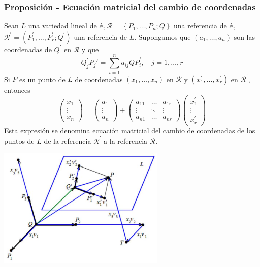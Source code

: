 \documentclass[12pt, a4paper, ones, notitlepage, openany,titlepage]{article}
\begin{document}
\subsubsection{Proposición - Ecuación matricial del cambio de coordenadas}
Sean $L$ una variedad lineal de $\mathbb{A}, \mathcal{R}=\left\{P_{1}, \ldots, P_{n} ; Q\right\}$ una referencia de $\mathbb{A}$, $\mathcal{R}^{\prime}=\left(P_{1}^{\prime}, \ldots, P_{r}^{\prime} ; Q^{\prime}\right)$ una referencia de $L$. Supongamos que $\left(a_{1}, \ldots, a_{n}\right)$ son las coordenadas de $Q^{\prime}$ en $\mathcal{R}$ y que
$$
Q_{j}^{\prime} P_j'=\sum_{i=1}^{n} a_{i j} \overrightarrow{QP_{i}}, \quad j=1, \ldots, r
$$
\noindent Si $P$ es un punto de $L$ de coordenadas $\left(x_{1}, \ldots, x_{n}\right)$ en $\mathcal{R}$ y $\left(x_{1}^{\prime}, \ldots, x_{r}^{\prime}\right)$ en $\mathcal{R}^{\prime}$, entonces
$$
\left(\begin{array}{r}
x_{1} \\
\vdots \\
x_{n}
\end{array}\right)=\left(\begin{array}{r}
a_{1} \\
\vdots \\
a_{n}
\end{array}\right)+\left(\begin{array}{rll}
a_{11} & \ldots & a_{1 r} \\
\vdots & \ddots & \vdots \\
a_{n 1} & \ldots & a_{n r}
\end{array}\right)\left(\begin{array}{r}
x_{1}^{\prime} \\
\vdots \\
x_{r}^{\prime}
\end{array}\right)
$$
Esta expresión se denomina ecuación matricial del cambio de coordenadas de los puntos de $L$ de la referencia $\mathcal{R}^{\prime}$ a la referencia $\mathcal{R}$.

\begin{center}
\includegraphics[max width=8cm]{2023_03_01_7659aec5e35f9a9b2d3cg-14}
\end{center}
\end{document}
